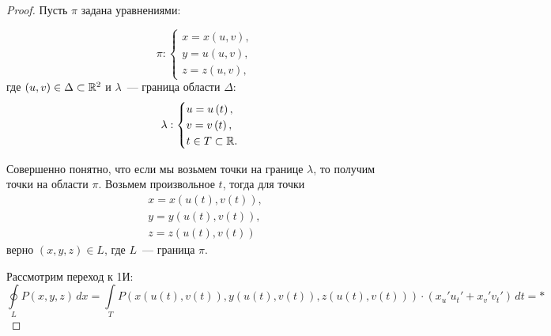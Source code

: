 \documentclass[../../main.tex]{subfiles}
\begin{document}
		\begin{proof}
			Пусть $\pi$ задана уравнениями:
			
			\[ \pi : \begin{cases} 
			x = x\left( u,v\right), \\ 
			y = u\left( u,v\right), \\ 
			z = z\left( u,v\right),  
			\end{cases} \]
			где $\left( u,v \right) \in \Delta \subset \mathbb{R}^2$ и $\lambda$~--- 
			граница области $\Delta$:
			\[ \lambda : \begin{cases} 
			u = u \left( t \right),  \\ 
			v = v \left( t \right), \\ 
			t \in T \subset \mathbb{R}.  
			\end{cases} \]
			
			Совершенно понятно, что если мы возьмем точки на границе $\lambda$, то 
			получим точки на области $\pi$. Возьмем произвольное $t$, тогда для точки
			 \begin{gather*} x = x( u( t), v( t)   ), \\
			 y = y( u( t), v( t)   ), \\
			 z = z( u( t), v( t)   )
			 \end{gather*}
			 верно $(x, y, z) \in L$, где $L$~--- граница $\pi$.
			 
			 Рассмотрим переход к 1И:
			 \[ \oint \limits_L P( x,y,z ) \, dx = \int \limits_T P ( x( u( t), v( t)   
			 ), y( u( t), v( t)   )  ,z( u( t), v( t)   ) ) \cdot ( x_u' u_t' + x_v' 
			 v_t' ) \, dt = *  \]
			 

\end{proof}
\end{document}
